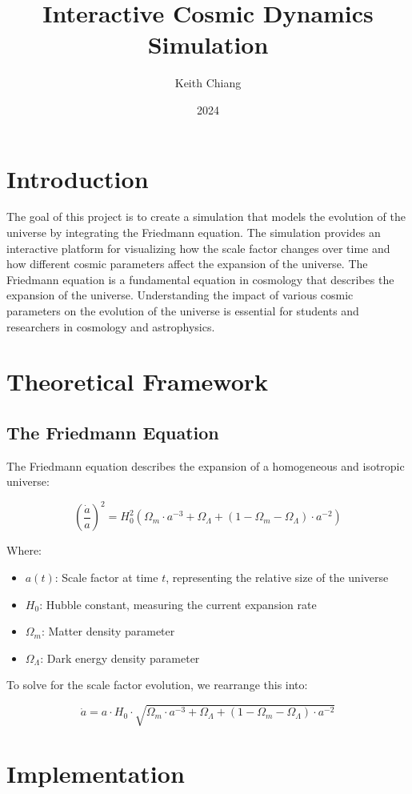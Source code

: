 \documentclass{article}
\title{Interactive Cosmic Dynamics Simulation}
\author{Keith Chiang}
\date{2024}
\begin{document}
\maketitle

\section{Introduction}
The goal of this project is to create a simulation that models the evolution of the universe by integrating the Friedmann equation. The simulation provides an interactive platform for visualizing how the scale factor changes over time and how different cosmic parameters affect the expansion of the universe. The Friedmann equation is a fundamental equation in cosmology that describes the expansion of the universe. Understanding the impact of various cosmic parameters on the evolution of the universe is essential for students and researchers in cosmology and astrophysics.

\section{Theoretical Framework}
\subsection{The Friedmann Equation}
The Friedmann equation describes the expansion of a homogeneous and isotropic universe:

\[
\left(\frac{\dot{a}}{a}\right)^2 = H_0^2 \left(\Omega_m \cdot a^{-3} + \Omega_\Lambda + (1 - \Omega_m - \Omega_\Lambda) \cdot a^{-2} \right)
\]

Where:
\begin{itemize}
\item $a(t)$: Scale factor at time $t$, representing the relative size of the universe
\item $H_0$: Hubble constant, measuring the current expansion rate
\item $\Omega_m$: Matter density parameter
\item $\Omega_\Lambda$: Dark energy density parameter
\end{itemize}

To solve for the scale factor evolution, we rearrange this into:

\[
\dot{a} = a \cdot H_0 \cdot \sqrt{\Omega_m \cdot a^{-3} + \Omega_\Lambda + (1 - \Omega_m - \Omega_\Lambda) \cdot a^{-2}}
\]

\section{Implementation}
\end{document}
